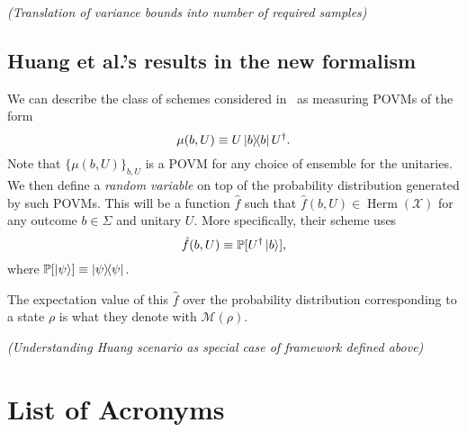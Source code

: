 \documentclass[12pt]{report}
\newcommand{\PP}{\mathbb{P}}
\newcommand{\calM}{{\mathcal{M}}}
\newcommand{\calX}{{\mathcal{X}}}
\newcommand{\heading}[1]{{\color{Mahogany}\emph{(#1)}}}
\DeclareMathOperator{\Herm}{Herm}
\begin{document}
\heading{Translation of variance bounds into number of required samples}


\subsection{Huang et al.'s results in the new formalism}

We can describe the class of schemes considered in~\parencite{huang2020predicting} as measuring POVMs of the form
\begin{equation}
    \mu(b,U) \equiv U\ketbra b U^\dagger.
\end{equation}
Note that $\{\mu(b,U)\}_{b,U}$ is a POVM for any choice of ensemble for the unitaries.
We then define a \textit{random variable} on top of the probability distribution generated by such POVMs.
This will be a function $\hat f$ such that
$\hat f(b,U)\in\Herm(\calX)$ for any outcome $b\in\Sigma$ and unitary $U$.
More specifically, their scheme uses
\begin{equation}
    \hat f(b,U) \equiv \PP[U^\dagger \ket b],
\end{equation}
where $\PP[\ket\psi]\equiv\ketbra\psi$.

The expectation value of this $\hat f$ over the probability distribution corresponding to a state $\rho$ is what they denote with $\calM(\rho)$.

\heading{Understanding Huang scenario as special case of framework defined above}



\printbibliography

\section*{List of Acronyms}
\begin{acronym}
\end{acronym}
\end{document}
